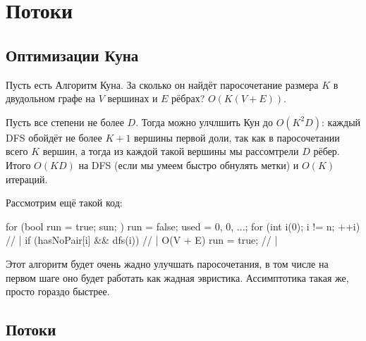 \chapter{Потоки}

\section{Оптимизации Куна}

Пусть есть Алгоритм Куна.
За сколько он найдёт паросочетание размера $K$ в двудольном графе на $V$ вершинах и $E$ рёбрах?
$O(K(V+E))$.

Пусть все степени не более $D$.
Тогда можно улчлшить Кун до $O(K^2D)$: каждый DFS обойдёт не более $K + 1$ вершины первой доли,
так как в паросочетании всего $K$ вершин, а тогда из каждой такой вершины мы рассомтрели $D$ рёбер.
Итого $O(KD)$ на DFS (если мы умеем быстро обнулять метки) и $O(K)$ итераций.

Рассмотрим ещё такой код:
\begin{cppcode}
for (bool run = true; sun; ) {
	run = false;
	used = {0, 0, ...};
	for (int i(0); i != n; ++i)     // |
		if (hasNoPair[i] && dfs(i)) // | O(V + E)
			run = true;             // |
}
\end{cppcode}
Этот алгоритм будет очень жадно улучшать паросочетания, в том числе на первом шаге оно будет работать как жадная эвристика.
Ассимптотика такая же, просто гораздо быстрее.

\section{Потоки}

